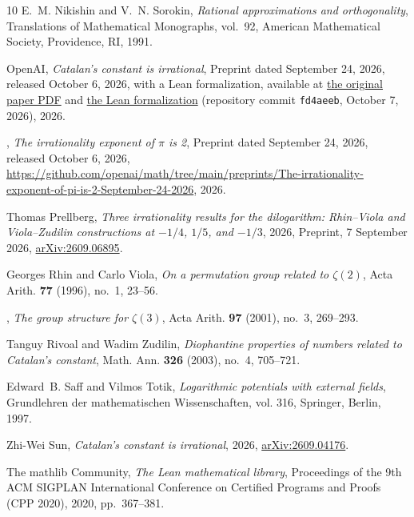 \documentclass[11pt]{amsart}
\theoremstyle{definition}
\theoremstyle{remark}
\numberwithin{equation}{section}
\begin{document}
\begin{thebibliography}{10}
E.~M. Nikishin and V.~N. Sorokin, \emph{Rational approximations and
  orthogonality}, Translations of Mathematical Monographs, vol.~92, American
  Mathematical Society, Providence, RI, 1991.

{OpenAI}, \emph{Catalan's constant is irrational}, Preprint dated September 24,
  2026, released October 6, 2026, with a Lean formalization, available at
  \href{https://github.com/openai/math/blob/fd4aeeb2ee4fc729c18d98444fed42fd0529eeeb/preprints/Catalans-constant-is-irrational-September-24-2026/paper.pdf}{the
  original paper PDF} and
  \href{https://github.com/openai/math/tree/fd4aeeb2ee4fc729c18d98444fed42fd0529eeeb/lean/OAI/NumberTheory/Catalan}{the
  Lean formalization} (repository commit \texttt{fd4aeeb}, October 7, 2026),
  2026.

\bysame, \emph{The irrationality exponent of {$\pi$} is 2}, Preprint dated
  September 24, 2026, released October 6, 2026,
  \url{https://github.com/openai/math/tree/main/preprints/The-irrationality-exponent-of-pi-is-2-September-24-2026},
  2026.

Thomas Prellberg, \emph{Three irrationality results for the dilogarithm:
  {R}hin--{V}iola and {V}iola--{Z}udilin constructions at {$-1/4$}, {$1/5$},
  and {$-1/3$}}, 2026, Preprint, 7 September 2026,
  \href{https://arxiv.org/abs/2609.06895}{arXiv:2609.06895}.

Georges Rhin and Carlo Viola, \emph{On a permutation group related to
  {$\zeta(2)$}}, Acta Arith. \textbf{77} (1996), no.~1, 23--56.

\bysame, \emph{The group structure for {$\zeta(3)$}}, Acta Arith. \textbf{97}
  (2001), no.~3, 269--293.

Tanguy Rivoal and Wadim Zudilin, \emph{Diophantine properties of numbers
  related to {C}atalan's constant}, Math. Ann. \textbf{326} (2003), no.~4,
  705--721.

Edward~B. Saff and Vilmos Totik, \emph{Logarithmic potentials with external
  fields}, Grundlehren der mathematischen Wissenschaften, vol. 316, Springer,
  Berlin, 1997.

Zhi-Wei Sun, \emph{Catalan's constant is irrational}, 2026,
  \href{https://arxiv.org/abs/2609.04176}{arXiv:2609.04176}.

{The mathlib Community}, \emph{The {L}ean mathematical library}, Proceedings of
  the 9th ACM SIGPLAN International Conference on Certified Programs and Proofs
  (CPP 2020), 2020, pp.~367--381.


\end{thebibliography}
\end{document}
